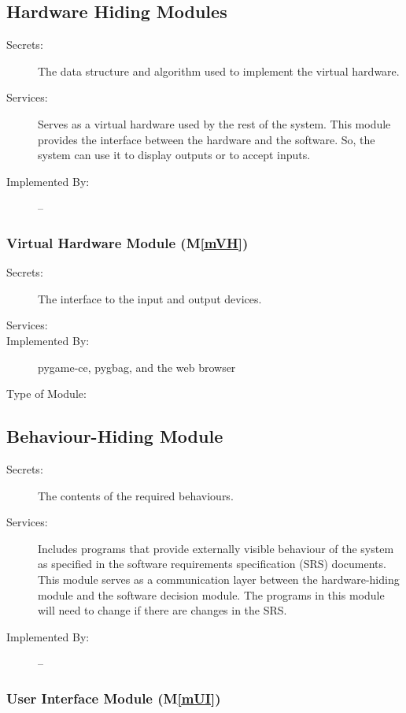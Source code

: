 \documentclass[12pt, titlepage]{article}
\newcommand{\mref}[1]{M\ref{#1}}
\begin{document}
\subsection{Hardware Hiding Modules}

\begin{description}
\item[Secrets:]The data structure and algorithm used to implement the virtual
  hardware.
\item[Services:]Serves as a virtual hardware used by the rest of the
  system. This module provides the interface between the hardware and the
  software. So, the system can use it to display outputs or to accept inputs.
\item[Implemented By:] --
\end{description}

\subsubsection{Virtual Hardware Module (\mref{mVH})}

\begin{description}
\item[Secrets:] The interface to the input and output devices.
\item[Services:]
\item[Implemented By:] pygame-ce, pygbag, and the web browser
\item[Type of Module:]
\end{description}

\subsection{Behaviour-Hiding Module}

\begin{description}
\item[Secrets:]The contents of the required behaviours.
\item[Services:]Includes programs that provide externally visible behaviour of
  the system as specified in the software requirements specification (SRS)
  documents. This module serves as a communication layer between the
  hardware-hiding module and the software decision module. The programs in this
  module will need to change if there are changes in the SRS.
\item[Implemented By:] --
\end{description}

\subsubsection{User Interface Module (\mref{mUI})}
\end{document}
